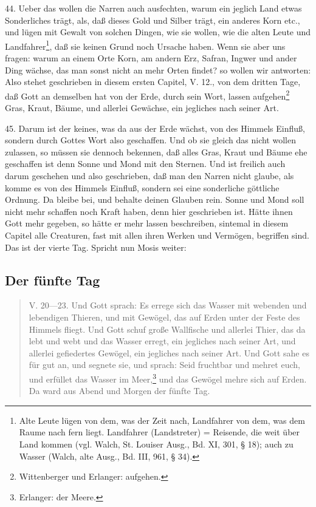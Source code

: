 44. Ueber das wollen die Narren auch ausfechten, warum ein jeglich Land etwas Sonderliches trägt, als, daß dieses Gold und Silber trägt, ein anderes Korn etc., und lügen mit Gewalt von solchen Dingen, wie sie wollen, wie die alten Leute und Landfahrer\footnote{Alte Leute lügen von dem, was der Zeit nach, Landfahrer von dem, was dem Raume nach fern liegt. Landfahrer (Landstreter) = Reisende, die weit über Land kommen (vgl. Walch, St. Louiser Ausg., Bd. XI, 301, § 18); auch zu Wasser (Walch, alte Ausg., Bd. III, 961, § 34).}, daß sie keinen Grund noch Ursache haben. Wenn sie aber uns fragen: warum an einem Orte Korn, am andern Erz, Safran, Ingwer und ander Ding wächse, das man sonst nicht an mehr Orten findet? so wollen wir antworten: Also stehet geschrieben in diesem ersten Capitel, V. 12., von dem dritten Tage, daß Gott an demselben hat von der Erde, durch sein Wort, lassen aufgehen\footnote{Wittenberger und Erlanger: aufgehen.} Gras, Kraut, Bäume, und allerlei Gewächse, ein jegliches nach seiner Art.

45. Darum ist der keines, was da aus der Erde wächst, von des Himmels Einfluß, sondern durch Gottes Wort also geschaffen. Und ob sie gleich das nicht wollen zulassen, so müssen sie dennoch bekennen, daß alles Gras, Kraut und Bäume ehe geschaffen ist denn Sonne und Mond mit den Sternen. Und ist freilich auch darum geschehen und also geschrieben, daß man den Narren nicht glaube, als komme es von des Himmels Einfluß, sondern sei eine sonderliche göttliche Ordnung. Da bleibe bei, und behalte deinen Glauben rein. Sonne und Mond soll nicht mehr schaffen noch Kraft haben, denn hier geschrieben ist. Hätte ihnen Gott mehr gegeben, so hätte er mehr lassen beschreiben, sintemal in diesem Capitel alle Creaturen, fast mit allen ihren Werken und Vermögen, begriffen sind. Das ist der vierte Tag. Spricht nun Mosis weiter:

\subsection{Der fünfte Tag}

\begin{quote}
V. 20—23. Und Gott sprach: Es errege sich das Wasser mit webenden und lebendigen Thieren, und mit Gewögel, das auf Erden unter der Feste des Himmels fliegt. Und Gott schuf große Wallfische und allerlei Thier, das da lebt und webt und das Wasser erregt, ein jegliches nach seiner Art, und allerlei gefiedertes Gewögel, ein jegliches nach seiner Art. Und Gott sahe es für gut an, und segnete sie, und sprach: Seid fruchtbar und mehret euch, und erfüllet das Wasser im Meer,\footnote{Erlanger: der Meere.} und das Gewögel mehre sich auf Erden. Da ward aus Abend und Morgen der fünfte Tag.
\end{quote}

